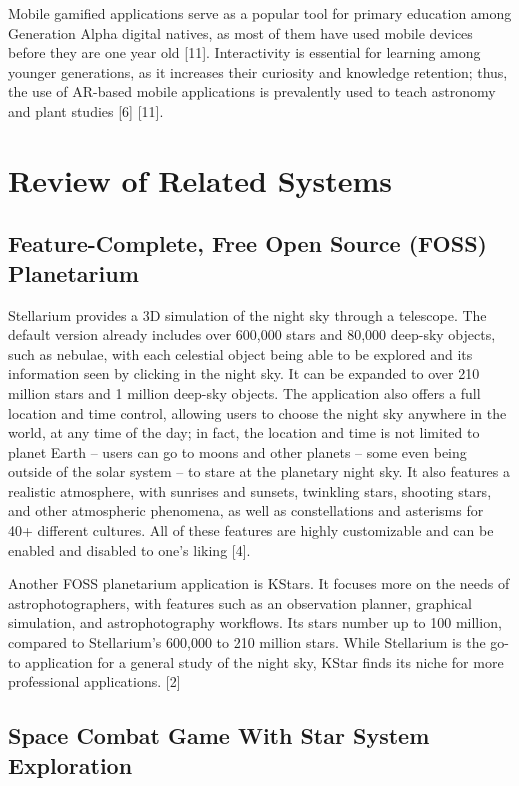 Mobile gamified applications serve as a popular tool for primary education among Generation Alpha digital natives, as most of them 
have used mobile devices before they are one year old [11]. Interactivity is essential for learning among younger generations, as it 
increases their curiosity and knowledge retention; thus, the use of AR-based mobile applications is prevalently used to teach astronomy 
and plant studies [6] [11].

\section{Review of Related Systems}

\subsection{Feature-Complete, Free Open Source (FOSS) Planetarium}

Stellarium provides a 3D simulation of the night sky through a telescope. The default version already includes over 600,000 stars 
and 80,000 deep-sky objects, such as nebulae, with each celestial object being able to be explored and its information seen by clicking 
in the night sky. It can be expanded to over 210 million stars and 1 million deep-sky objects. The application also offers a full 
location and time control, allowing users to choose the night sky anywhere in the world, at any time of the day; in fact, the location 
and time is not limited to planet Earth – users can go to moons and other planets – some even being outside of the solar system – to 
stare at the planetary night sky. It also features a realistic atmosphere, with sunrises and sunsets, twinkling stars, shooting stars, 
and other atmospheric phenomena, as well as constellations and asterisms for 40+ different cultures. All of these features are highly 
customizable and can be enabled and disabled to one’s liking [4].

Another FOSS planetarium application is KStars. It focuses more on the needs of astrophotographers, with features such as an observation 
planner, graphical simulation, and astrophotography workflows. Its stars number up to 100 million, compared to Stellarium’s 600,000 to 
210 million stars. While Stellarium is the go-to application for a general study of the night sky, KStar finds its niche for more 
professional applications. [2]

\subsection{Space Combat Game With Star System Exploration}

